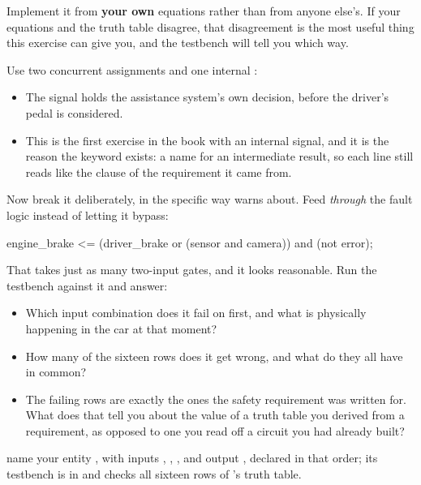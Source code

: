 \begin{parts}
  \item Implement it from \textbf{your own} equations rather than from anyone else's. If your
    equations and the truth table disagree, that disagreement is the most useful thing this
    exercise can give you, and the testbench will tell you which way.

    Use two concurrent assignments and one internal :
    \begin{itemize}
      \item The signal holds the assistance system's own decision, before the driver's pedal is
        considered.
      \item This is the first exercise in the book with an internal signal, and it is the reason the
        keyword exists: a name for an intermediate result, so each line still reads like the clause
        of the requirement it came from.
    \end{itemize}
  \item Now break it deliberately, in the specific way  warns about. Feed
     \emph{through} the fault logic instead of letting it bypass:

\begin{vhdlcode}
engine_brake <= (driver_brake or (sensor and camera)) and (not error);
\end{vhdlcode}

    That takes just as many two-input gates, and it looks reasonable. Run the testbench against it
    and answer:
    \begin{itemize}
      \item Which input combination does it fail on first, and what is physically happening in the
        car at that moment?
      \item How many of the sixteen rows does it get wrong, and what do they all have in common?
      \item The failing rows are exactly the ones the safety requirement was written for. What does
        that tell you about the value of a truth table you derived from a requirement, as opposed
        to one you read off a circuit you had already built?
    \end{itemize}
\end{parts}


\selfcheck name your entity , with inputs , ,
,  and output , declared in that order; its testbench is
in  and checks all sixteen rows of 's truth table.
